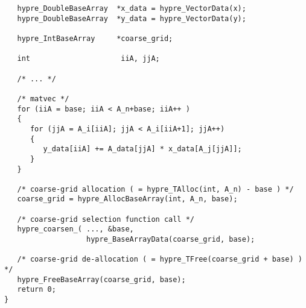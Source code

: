 \begin{verbatim}
   hypre_DoubleBaseArray  *x_data = hypre_VectorData(x);
   hypre_DoubleBaseArray  *y_data = hypre_VectorData(y);

   hypre_IntBaseArray     *coarse_grid;

   int                     iiA, jjA;

   /* ... */

   /* matvec */
   for (iiA = base; iiA < A_n+base; iiA++ )
   {
      for (jjA = A_i[iiA]; jjA < A_i[iiA+1]; jjA++)
      {
         y_data[iiA] += A_data[jjA] * x_data[A_j[jjA]];
      }
   }

   /* coarse-grid allocation ( = hypre_TAlloc(int, A_n) - base ) */
   coarse_grid = hypre_AllocBaseArray(int, A_n, base);

   /* coarse-grid selection function call */
   hypre_coarsen_( ..., &base,
                   hypre_BaseArrayData(coarse_grid, base);

   /* coarse-grid de-allocation ( = hypre_TFree(coarse_grid + base) ) */
   hypre_FreeBaseArray(coarse_grid, base);
   return 0;
}

\end{verbatim}

